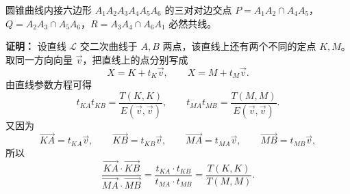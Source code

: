 \begin{conclusion}
    圆锥曲线内接六边形 $A_1A_2A_3A_4A_5A_6$ 的三对对边交点 $P=A_1A_2 \cap A_4A_5$，$Q=A_2A_3 \cap A_5A_6$，$R=A_3A_4 \cap A_6A_1$ 必然共线。
\end{conclusion}
\textbf{证明：}
设直线 $\mathcal{L}$ 交二次曲线于 $A, B$ 两点，该直线上还有两个不同的定点 $K, M$。取同一方向向量 $\vec{v}$，把直线上的点分别写成
\[
X = K + t_K\vec{v},\qquad X = M + t_M\vec{v}.
\]
由直线参数方程可得
\[
t_{KA} t_{KB} = \frac{T(K, K)}{E(\vec{v}, \vec{v})},\qquad t_{MA} t_{MB} = \frac{T(M, M)}{E(\vec{v}, \vec{v})}.
\]
又因为
\[
\overrightarrow{KA} = t_{KA}\vec{v},\qquad \overrightarrow{KB} = t_{KB}\vec{v},\qquad
\overrightarrow{MA} = t_{MA}\vec{v},\qquad \overrightarrow{MB} = t_{MB}\vec{v},
\]
所以
\[
\frac{\overrightarrow{KA} \cdot \overrightarrow{KB}}{\overrightarrow{MA} \cdot \overrightarrow{MB}}
= \frac{t_{KA} \cdot t_{KB}}{t_{MA} \cdot t_{MB}}
= \frac{T(K,K)}{T(M,M)}.
\]

